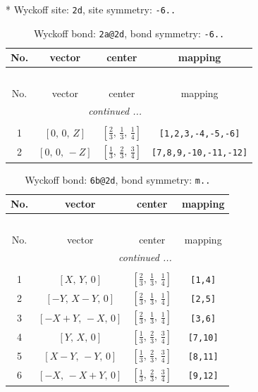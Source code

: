 \documentclass[fleqn,8pt]{jsarticle}
\begin{document}
* Wyckoff site: {\tt 2d}, site symmetry: {\tt -6..}
\renewcommand{\arraystretch}{1.2}
\begin{longtable}{cccc}
\caption{Wyckoff bond: {\tt 2a@2d}, bond symmetry: {\tt -6..}}
 \\
 \hline \hline
No. & vector & center & mapping \\ \hline \endfirsthead

\multicolumn{3}{l}{\tablename\ \thetable{}} \\
 \hline \hline
No. & vector & center & mapping \\ \hline \endhead

 \hline \hline
\multicolumn{3}{r}{\footnotesize\it continued ...} \\ \endfoot

 \hline \hline
\multicolumn{3}{r}{} \\ \endlastfoot

1 & $\left[ 0,\, 0,\, Z \right]$ & $\left[ \frac{2}{3},\, \frac{1}{3},\, \frac{1}{4} \right]$ & {\tt [1,2,3,-4,-5,-6]} \\ \hline
2 & $\left[ 0,\, 0,\, - Z \right]$ & $\left[ \frac{1}{3},\, \frac{2}{3},\, \frac{3}{4} \right]$ & {\tt [7,8,9,-10,-11,-12]} \\
\end{longtable}
\renewcommand{\arraystretch}{1.2}
\begin{longtable}{cccc}
\caption{Wyckoff bond: {\tt 6b@2d}, bond symmetry: {\tt m..}}
 \\
 \hline \hline
No. & vector & center & mapping \\ \hline \endfirsthead

\multicolumn{3}{l}{\tablename\ \thetable{}} \\
 \hline \hline
No. & vector & center & mapping \\ \hline \endhead

 \hline \hline
\multicolumn{3}{r}{\footnotesize\it continued ...} \\ \endfoot

 \hline \hline
\multicolumn{3}{r}{} \\ \endlastfoot

1 & $\left[ X,\, Y,\, 0 \right]$ & $\left[ \frac{2}{3},\, \frac{1}{3},\, \frac{1}{4} \right]$ & {\tt [1,4]} \\ \hline
2 & $\left[ - Y,\, X - Y,\, 0 \right]$ & $\left[ \frac{2}{3},\, \frac{1}{3},\, \frac{1}{4} \right]$ & {\tt [2,5]} \\ \hline
3 & $\left[ - X + Y,\, - X,\, 0 \right]$ & $\left[ \frac{2}{3},\, \frac{1}{3},\, \frac{1}{4} \right]$ & {\tt [3,6]} \\ \hline
4 & $\left[ Y,\, X,\, 0 \right]$ & $\left[ \frac{1}{3},\, \frac{2}{3},\, \frac{3}{4} \right]$ & {\tt [7,10]} \\ \hline
5 & $\left[ X - Y,\, - Y,\, 0 \right]$ & $\left[ \frac{1}{3},\, \frac{2}{3},\, \frac{3}{4} \right]$ & {\tt [8,11]} \\ \hline
6 & $\left[ - X,\, - X + Y,\, 0 \right]$ & $\left[ \frac{1}{3},\, \frac{2}{3},\, \frac{3}{4} \right]$ & {\tt [9,12]} \\
\end{longtable}
\end{document}
